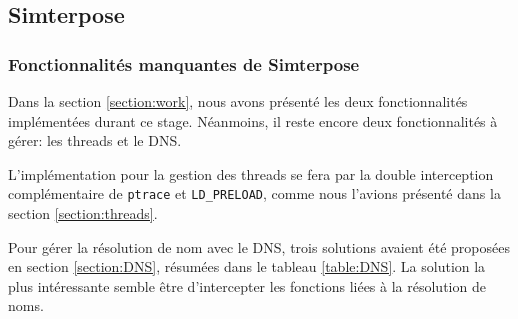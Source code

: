 \subsection{Simterpose}
\subsubsection{Fonctionnalités manquantes de Simterpose}
Dans la section \ref{section:work}, nous avons présenté les deux fonctionnalités implémentées durant ce stage. Néanmoins, il reste encore deux fonctionnalités à gérer: les threads et le DNS.

L'implémentation pour la gestion des threads se fera par la double interception complémentaire de \texttt{ptrace} et \texttt{LD\_PRELOAD}, comme nous l'avions présenté dans la section \ref{section:threads}.

Pour gérer la résolution de nom avec le DNS, trois solutions avaient été proposées en section \ref{section:DNS}, résumées dans le tableau \ref{table:DNS}. La solution la plus intéressante semble être d'intercepter les fonctions liées à la résolution de noms.

